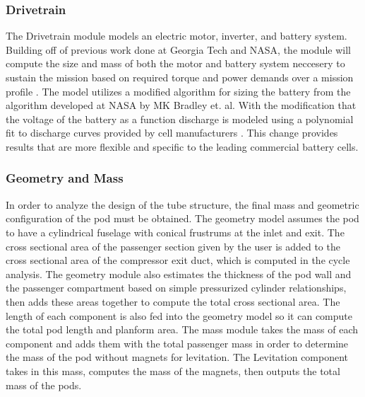 \subsubsection{Drivetrain}
	The Drivetrain module models an electric motor, inverter, and battery system.
	Building off of previous work done at Georgia Tech and NASA, the module
	will compute the size and mass of both the motor and battery system
	neccesery to sustain the mission based on required torque and power demands
	over a mission profile \cite{GeorgiaTechMotor, NASASugar}. The model
	utilizes a modified algorithm for sizing the battery from the algorithm
	developed at NASA by MK Bradley et. al. With the modification that the
	voltage of the battery as a function discharge is modeled using a
	polynomial fit to discharge curves provided by cell manufacturers \cite{NASASugar}.
	This change provides results that are more flexible and specific to the
	leading commercial battery cells.
\subsubsection{Geometry and Mass}
	In order to analyze the design of the tube structure, the final mass and
	geometric configuration of the pod must be obtained. The geometry model
	assumes the pod to have a cylindrical fuselage with conical frustrums at
	the inlet and exit. The cross sectional area of the passenger section
	given by the user is added to the cross sectional area of the compressor
	exit duct, which is computed in the cycle analysis. The geometry module
	also estimates the thickness of the pod wall and the passenger compartment
	based on simple pressurized cylinder relationships, then adds these areas
	together to compute the total cross sectional area. The length of each
	component is also fed into the geometry model so it can compute the total
	pod length and planform area. The mass module takes the mass of each
	component and adds them with the total passenger mass in order to determine
	the mass of the pod without magnets for levitation. The Levitation component
	takes in this mass, computes the mass of the magnets, then outputs the total mass of the pods.
